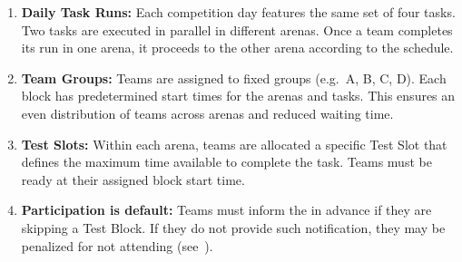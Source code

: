 \begin{enumerate}
	 \item \textbf{Daily Task Runs:} 
	Each competition day features the same set of four tasks.
	Two tasks are executed in parallel in different arenas.
	Once a team completes its run in one arena, it proceeds to the other arena according to the schedule.

	\item \textbf{Team Groups:}
	Teams are assigned to fixed groups (e.g.\ A, B, C, D).
	Each block has predetermined start times for the arenas and tasks.
	This ensures an even distribution of teams across arenas and reduced waiting time.

	\item \textbf{Test Slots:} Within each arena, teams are allocated a specific Test Slot that defines the maximum time available to complete the task. 
    Teams must be ready at their assigned block start time.

	\item \textbf{Participation is default:} Teams must inform the \OC{} in advance if they are skipping a Test Block. If they do not provide such notification, they may be penalized for not attending (see~).
	
\end{enumerate}

